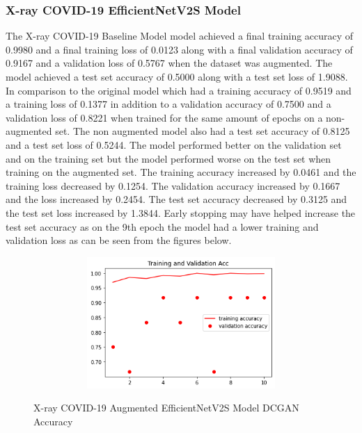 \subsubsection{X-ray COVID-19 EfficientNetV2S Model}
The X-ray COVID-19 Baseline Model model achieved a final training accuracy of 0.9980 and a final training loss of 0.0123 along with a final validation accuracy of 0.9167 and a validation loss of 0.5767 when the dataset was augmented.  The model achieved a test set accuracy of 0.5000 along with a test set loss of 1.9088.  In comparison to the original model which had a training accuracy of 0.9519 and a training loss of 0.1377 in addition to a validation accuracy of 0.7500 and a validation loss of 0.8221 when trained for the same amount of epochs on a non-augmented set.  The non augmented model also had a test set accuracy of 0.8125 and a test set loss of 0.5244.  The model performed better on the validation set and on the training set but the model performed worse on the test set when training on the augmented set.  The training accuracy increased by 0.0461 and the training loss decreased by 0.1254. The validation accuracy increased by 0.1667 and the loss increased by 0.2454.  The test set accuracy decreased by 0.3125 and the test set loss increased by 1.3844.  Early stopping may have helped increase the test set accuracy as on the 9th epoch the model had a lower training and validation loss as can be seen from the figures below.
 \begin{figure}[H]
    \centering    
    \includegraphics[width=1\textwidth,height=5cm,keepaspectratio]{Images/EfficientNetV2SBaselineTrainingValidationAccXRayCOVID19AugmentedDCGAN.png}\\
    \caption{X-ray COVID-19 Augmented EfficientNetV2S Model DCGAN Accuracy}
    \label{fig:X-ray COVID-19 Augmented EfficientNetV2S Model DCGAN Accuracy}
\end{figure}
